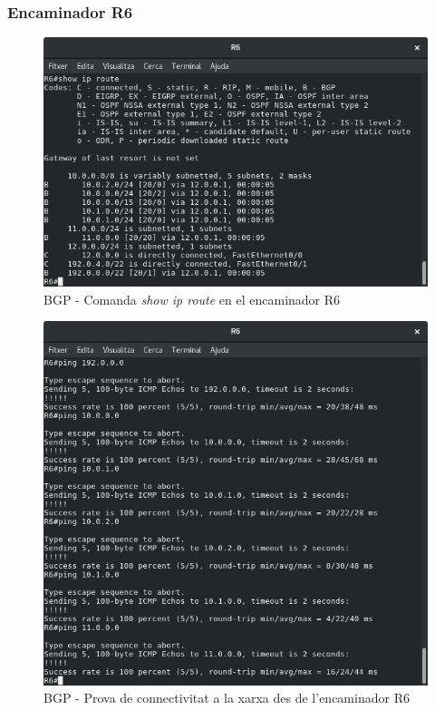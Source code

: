 \documentclass[10pt]{article}
\begin{document}
\subsubsection{Encaminador R6}
\begin{figure}[H]
\begin{center}
\includegraphics[scale=0.5]{Images/bgp-R6-route.png}
\caption{BGP - Comanda \textit{show ip route} en el encaminador R6}
\end{center}
\end{figure}
\begin{figure}[H]
\begin{center}
\includegraphics[scale=0.5]{Images/bgp-R6-conectivity.png}
\caption{BGP - Prova de connectivitat a la xarxa des de l'encaminador R6}
\end{center}
\end{figure}
\end{document}

